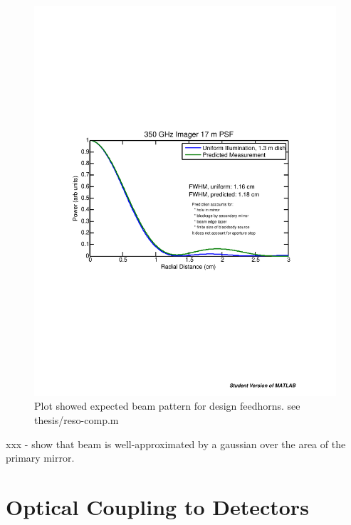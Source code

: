 \begin{figure}
\centering
\includegraphics{images/ch4-reso-comp.pdf}
\caption{
Plot showed expected beam pattern for design feedhorns. see thesis/reso-comp.m
}
\label{fig:ch4-reso-comp}
\end{figure}

xxx - show that beam is well-approximated by a gaussian over the area of the primary mirror.

%


\section{Optical Coupling to Detectors}

